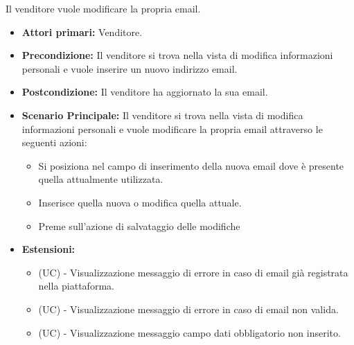 Il venditore vuole modificare la propria email.
\begin{itemize}
    \item \textbf{Attori primari:} Venditore.
    \item \textbf{Precondizione:} Il venditore si trova nella vista di modifica informazioni personali e vuole inserire un nuovo indirizzo email.
    \item \textbf{Postcondizione:} Il venditore ha aggiornato la sua email.
    \item \textbf{Scenario Principale:} Il venditore si trova nella vista di modifica informazioni personali e vuole modificare la propria email attraverso le seguenti azioni:
        \begin{itemize}
            \item Si posiziona nel campo di inserimento della nuova email dove è presente quella attualmente utilizzata.
            \item Inserisce quella nuova o modifica quella attuale.
            \item Preme sull'azione di salvataggio delle modifiche
        \end{itemize}
    \item \textbf{Estensioni:}
    \begin{itemize}
        \item (UC) - Visualizzazione messaggio di errore in caso di email già registrata nella piattaforma.
        \item (UC) - Visualizzazione messaggio di errore in caso di email non valida.
        \item (UC) - Visualizzazione messaggio campo dati obbligatorio non inserito.
    \end{itemize}
\end{itemize}

